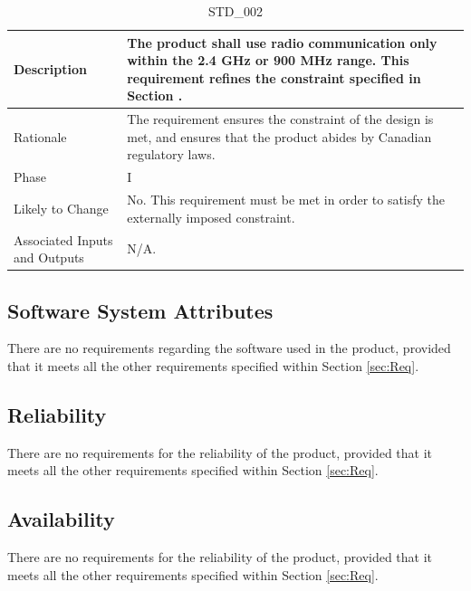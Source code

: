 \documentclass{article}
\begin{document}
\begin{table}[!h]
\begin{center}
\caption {STD\_002} 
\label{STD_002}
\begin{tabular}{ | m{3cm} | m{11cm} | }
\hline
Description & The product shall use radio communication only within the 2.4 GHz or 900 MHz range. This requirement refines the constraint specified in Section \nameref{sec:Constraints}. \\
\hline
Rationale & The requirement ensures the constraint of the design is met, and ensures that the product abides by Canadian regulatory laws. \\
\hline
Phase & I \\
\hline
Likely to Change &  No. This requirement must be met in order to satisfy the externally imposed constraint. \\
\hline
Associated Inputs and Outputs & N/A.  \\
\hline
\end{tabular}
\end{center}
\end{table}

\subsection{Software System Attributes}
There are no requirements regarding the software used in the product, provided that it meets all the other requirements specified within Section \ref{sec:Req}.

\subsection{Reliability }
There are no requirements for the reliability of the product, provided that it meets all the other requirements specified within Section \ref{sec:Req}.

\subsection{Availability}
There are no requirements for the reliability of the product, provided that it meets all the other requirements specified within Section \ref{sec:Req}.
\end{document}
